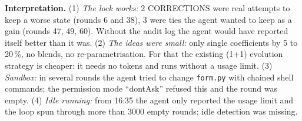 \textbf{Interpretation.} (1) \emph{The lock works:} 2 CORRECTIONS were real attempts to keep a worse state (rounds 6 and 38), 3 were ties the agent wanted to keep as a gain (rounds 47, 49, 60). Without the audit log the agent would have reported itself better than it was.
(2) \emph{The ideas were small:} only single coefficients by 5 to 20\,\%, no blends, no re-parametrisation. For that the existing (1+1) evolution strategy is cheaper: it needs no tokens and runs without a usage limit.
(3) \emph{Sandbox:} in several rounds the agent tried to change \texttt{form.py} with chained shell commands; the permission mode ``dontAsk'' refused this and the round was empty.
(4) \emph{Idle running:} from 16:35 the agent only reported the usage limit and the loop spun through more than 3000 empty rounds; idle detection was missing.

